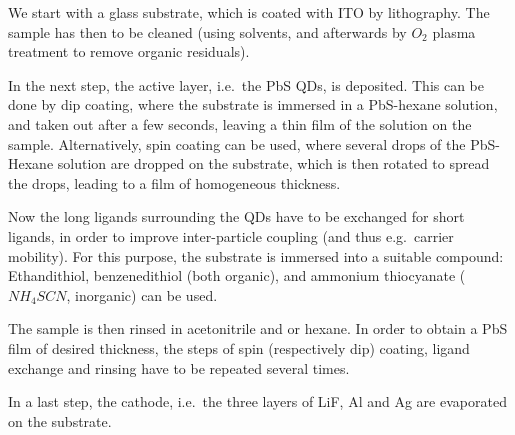 We start with a glass substrate, which is coated with ITO by lithography. The sample has then to be cleaned (using solvents, and afterwards by $O_2$ plasma treatment to remove organic residuals). 

In the next step, the active layer, i.e.~the PbS QDs, is deposited. This can be done by dip coating, where the substrate is immersed in a PbS-hexane solution, and taken out after a few seconds, leaving a thin film of the solution on the sample. Alternatively, spin coating can be used, where several drops of the PbS-Hexane solution are dropped on the substrate, which is then rotated to spread the drops, leading to a film of homogeneous thickness. 

Now the long ligands surrounding the QDs have to be exchanged for short ligands, in order to improve inter-particle coupling (and thus e.g.~carrier mobility). For this purpose, the substrate is immersed into a suitable compound: Ethandithiol, benzenedithiol (both organic), and ammonium thiocyanate ($NH_4SCN$, inorganic) can be used.

The sample is then rinsed in acetonitrile and or hexane. In order to obtain a PbS film of desired thickness, the steps of spin (respectively dip) coating, ligand exchange and rinsing have to be repeated several times.

In a last step, the cathode, i.e.~the three layers of LiF, Al and Ag are evaporated on the substrate.
	